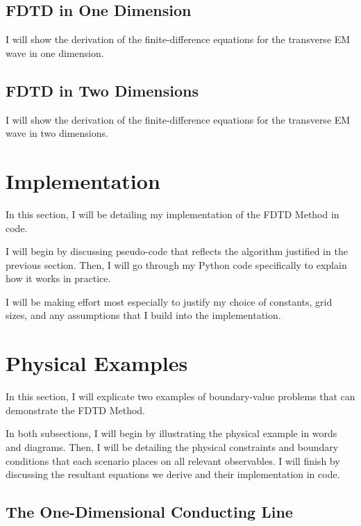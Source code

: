 \documentclass[reprint,preprintnumbers,amsmath,amssymb,aps,nofootinbib,showkeys]{revtex4-2}
\begin{document}
\subsection{FDTD in One Dimension}

    I will show the derivation of the finite-difference equations for the transverse EM wave in one dimension.

\subsection{FDTD in Two Dimensions}

    I will show the derivation of the finite-difference equations for the transverse EM wave in two dimensions.

    
\section{Implementation}\label{code}

    In this section, I will be detailing my implementation of the FDTD Method in code.

    I will begin by discussing pseudo-code that reflects the algorithm justified in the previous section. Then, I will go through my Python code specifically to explain how it works in practice.

    I will be making effort most especially to justify my choice of constants, grid sizes, and any assumptions that I build into the implementation.
    

\section{Physical Examples}\label{examples}

    In this section, I will explicate two examples of boundary-value problems that can demonstrate the FDTD Method.

    In both subsections, I will begin by illustrating the physical example in words and diagrams. Then, I will be detailing the physical constraints and boundary conditions that each scenario places on all relevant observables. I will finish by discussing the resultant equations we derive and their implementation in code.

\subsection{The One-Dimensional Conducting Line}
\end{document}

